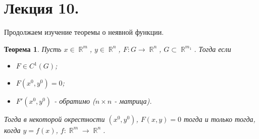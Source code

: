 \documentclass[a4paper,100pt]{article}
\theoremstyle{indented}
\newtheorem{theorem}{Теорема}
\theoremstyle{definition}
\theoremstyle{remark}
\DeclareMathOperator{\RR}{\mathbb{R}}
\begin{document}
\section{Лекция 10.}

Продолжаем изучение теоремы о неявной функции.

\begin{theorem}
    Пусть $x\in \RR^m$, $y\in \RR^n$, $F:G\rightarrow \RR^n$, $G\subset \RR^{m_1}$. Тогда если

    \begin{itemize}
        \item $F\in C^1(G)$; 
        \item $F(x^0, y^0)=0$; 
        \item $F'(x^0, y^0)$ - обратимо ($n\times n$ - матрица).
    \end{itemize}

    Тогда в некоторой окрестности $(x^0, y^0)$, $F(x, y)=0$ тогда и только тогда, когда $y=f(x)$, $f:\RR^m\rightarrow \RR^n$. 
\end{theorem}
\end{document}

